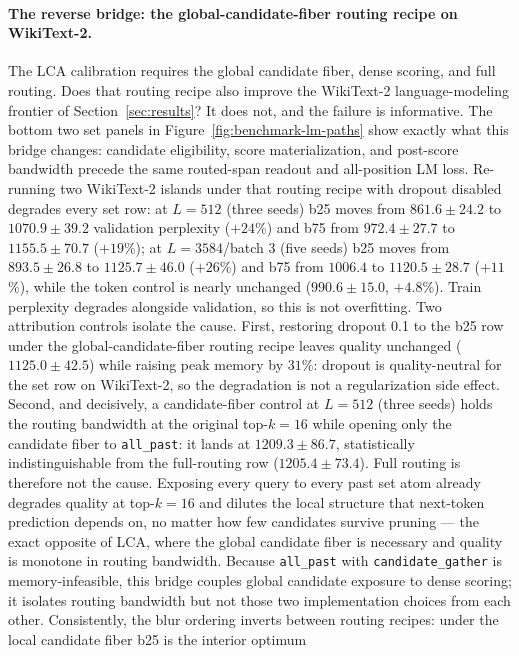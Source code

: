 \documentclass{article}
\theoremstyle{plain}
\theoremstyle{definition}
\theoremstyle{remark}
\begin{document}
\paragraph{The reverse bridge: the global-candidate-fiber routing recipe on
WikiText-2.}
The LCA calibration requires the global candidate fiber, dense scoring, and
full routing.  Does that routing recipe also improve the WikiText-2
language-modeling frontier of Section~\ref{sec:results}?  It does not, and the
failure is informative.  The bottom two set panels in
Figure~\ref{fig:benchmark-lm-paths} show exactly what this bridge changes:
candidate eligibility, score materialization, and post-score bandwidth precede
the same routed-span readout and all-position LM loss.  Re-running two
WikiText-2 islands under that routing
recipe with dropout disabled degrades every set row: at $L=512$
(three seeds) b25 moves from $861.6\pm24.2$ to $1070.9\pm39.2$ validation
perplexity ($+24$\%) and b75 from $972.4\pm27.7$ to $1155.5\pm70.7$
($+19$\%); at $L=3584$/batch 3 (five seeds) b25 moves from $893.5\pm26.8$ to
$1125.7\pm46.0$ ($+26$\%) and b75 from $1006.4$ to $1120.5\pm28.7$ ($+11$\%),
while the token control is nearly unchanged ($990.6\pm15.0$, $+4.8$\%).
Train perplexity degrades alongside validation, so this is not overfitting.
Two attribution controls isolate the cause.  First, restoring dropout 0.1 to
the b25 row under the global-candidate-fiber routing recipe leaves quality unchanged
($1125.0\pm42.5$) while raising
peak memory by $31$\%: dropout is quality-neutral for the set row on
WikiText-2, so the degradation is not a regularization side effect.  Second,
and decisively, a candidate-fiber control at $L=512$ (three seeds) holds the
routing bandwidth at the original top-$k{=}16$ while opening only the
candidate fiber to \texttt{all\_past}: it lands at $1209.3\pm86.7$,
statistically indistinguishable from the full-routing row
($1205.4\pm73.4$).  Full routing is therefore not the cause.  Exposing every
query to every past set atom already degrades quality at top-$k{=}16$ and
dilutes the local structure that next-token prediction depends on, no matter
how few candidates survive pruning --- the exact opposite of LCA, where the
global candidate fiber is necessary and quality is monotone in routing
bandwidth.  Because \texttt{all\_past} with \texttt{candidate\_gather} is
memory-infeasible, this bridge couples global candidate exposure to dense
scoring; it isolates routing bandwidth but not those two implementation
choices from each other.  Consistently, the blur ordering inverts between
routing recipes: under the local candidate fiber b25 is the interior optimum
\end{document}
